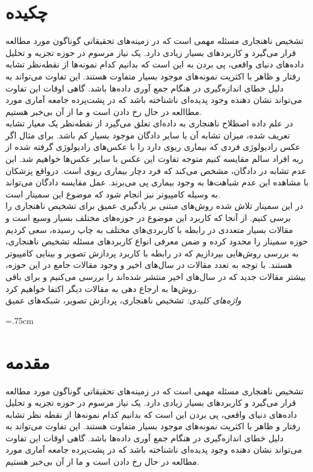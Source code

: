 \documentclass[12pt,a4paper]{report}
\newcommand*{\BeginNoToc}{%
  \addtocontents{toc}{%
    \edef\protect\SavedTocDepth{\protect\the\protect\value{tocdepth}}%
  }%
  \addtocontents{toc}{%
    \protect\setcounter{tocdepth}{-10}%
  }%
}
\newcommand*{\EndNoToc}{%
  \addtocontents{toc}{%
    \protect\setcounter{tocdepth}{\protect\SavedTocDepth}%
  }%
}
\begin{document}
	\chapter*{چکیده}
	تشخیص ناهنجاری‌ مسئله مهمی است که در زمینه‌های تحقیقاتی گوناگون مورد مطالعه قرار می‌گیرد و کاربرد‌های بسیار زیادی دارد. یک نیاز مرسوم در حوزه تجزیه و تحلیل داده‌های دنیای واقعی، پی بردن به این است که بدانیم کدام نمونه‌ها از نقطه‌نظر تشابه رفتار و ظاهر با اکثریت نمونه‌های موجود بسیار متفاوت هستند. این تفاوت می‌تواند به دلیل خطای انداز‌ه‌گیری در هنگام جمع آوری داده‌ها باشد. گاهی اوقات این تفاوت می‌تواند نشان‌ دهنده وجود پدیده‌ای ناشناخته‌ باشد که در پشت‌پرده جامعه آماری مورد مطاالعه در حال رخ دادن است و ما از آن بی‌خبر هستیم. \\

در علم داده اصطلاح ناهنجاری به داده‌ای تعلق می‌گیرد از نقطه‌نظر یک معیار تشابه تعریف شده، میزان تشابه آن با سایر دادگان موجود بسیار کم باشد. برای مثال اگر عکس رادیولوژی فردی که بیماری ریوی دارد را با عکس‌های رادیولوژی گرفته شده از ریه افراد سالم مقایسه کنیم متوجه تفاوت این عکس با سایر عکس‌ها خواهیم شد. این عدم تشابه در دادگان، مشخص می‌کند  که فرد دچار بیماری ریوی است. درواقع پزشکان با مشاهده این عدم شباهت‌ها به وجود بیماری پی می‌برند. عمل مقایسه دادگان می‌تواند به وسیله کامپیوتر نیز انجام شود که موضوع این سمینار است.\\

در این سمینار تلاش شده روش‌های مبتنی بر یادگیری عمیق برای تشخیص ناهنجاری را برسی کنیم. از آنجا که کاربرد این موضوع در حوزه‌های مختلف بسیار وسیع است و مقالات بسیار متعددی در رابطه با کاربردی‌های مختلف به چاپ رسیده، سعی کردیم حوزه سمینار را محدود کرده و ضمن معرفی انواع کاربرد‌های مسئله تشخیص ناهنجاری، به بررسی روش‌هایی بپردازیم که در رابطه با کاربرد پردازش تصویر و بینایی کامپیوتر هستند. با توجه به تعدد مقالات در سال‌های اخیر و وجود مقالات جامع در این حوزه، بیشتر مقالات جدید که در سال‌های اخیر منتشر شده‌اند را بررسی می‌کنیم و برای باقی روش‌ها به ارجاع دهی به مقالات دیگر اکتفا خواهیم کرد.\\

	\textit{
واژه‌های کلیدی:
	}
	تشخیص ناهنجاری، پردازش تصویر، شبکه‌های عمیق
	\newpage
	\baselineskip=1cm
	\BeginNoToc
	\tableofcontents
	\listoffigures
	\listoftables
	\EndNoToc
	\newpage
	\baselineskip=.75cm

\chapter{مقدمه}
	تشخیص ناهنجاری‌ مسئله مهمی است که در زمینه‌های تحقیقاتی گوناگون مورد مطالعه قرار می‌گیرد و کاربرد‌های بسیار زیادی دارد. یک نیاز مرسوم در حوزه تجزیه و تحلیل داده‌های دنیای واقعی، پی بردن این است که بدانیم کدام نمونه‌ها از نقطه نظر تشابه رفتار و ظاهر با اکثریت نمونه‌های موجود بسیار متفاوت هستند. این تفاوت می‌تواند به دلیل خطای انداز‌ه‌گیری در هنگام جمع آوری داده‌ها باشد. گاهی اوقات این تفاوت می‌تواند نشان‌ دهنده وجود پدیده‌ای ناشناخته‌ باشد که در پشت‌پرده جامعه آماری مورد مطالعه در حال رخ دادن است و ما از آن بی‌خبر هستیم. 
	
\end{document}
